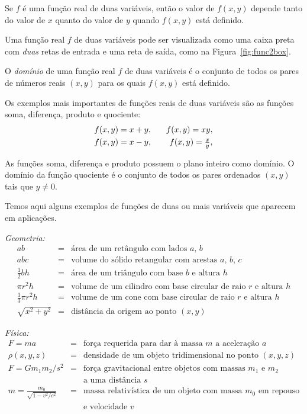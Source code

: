 \documentclass{svmono}
\begin{document}
Se $f$ é uma função real de duas variáveis, então o valor
de $f(x,y)$ depende tanto do valor de $x$ quanto do valor
de $y$ quando $f(x,y)$ está definido.

Uma função real $f$ de duas variáveis pode ser visualizada
como uma caixa preta com \emph{duas} retas de entrada e uma
reta de saída, como na Figura~\ref{fig:func2box}.


O \emph{domínio} de uma função real $f$ de duas variáveis é
o conjunto de todos os pares de números reais $(x,y)$ para os
quais $f(x,y)$ está definido.

Os exemplos mais importantes de funções reais de duas variáveis
são as funções soma, diferença, produto e quociente:
\begin{eqnarray*}
  f(x,y) = x+y, & \hspace{2ex} & f(x,y) = xy, \\
  f(x,y) = x-y, & \hspace{2ex} & \textstyle f(x,y) = \frac{x}{y},
\end{eqnarray*}

As funções soma, diferença e produto possuem o plano inteiro
como domínio. O domínio da função quociente é o conjunto de
todos os pares ordenados $(x,y)$ tais que $y \ne 0$.

Temos aqui alguns exemplos de funções de duas ou mais variáveis
que aparecem em aplicações.

\emph{Geometria:}
\begin{eqnarray*}
  ab & = & \text{área de um retângulo com lados $a$, $b$} \\
 abc & = & \text{volume do sólido retangular com arestas $a$, $b$, $c$} \\
\textstyle
\frac{1}{2}bh & = & \text{área de um triângulo com base $b$ e altura $h$} \\
\pi r^2 h & = & \text{volume de um cilindro com base circular de raio $r$ e altura $h$} \\
\textstyle
\frac{1}{3} \pi r^2 h & = & \text{volume de um cone com base circular
                            de raio $r$ e altura $h$} \\
\textstyle
\sqrt{x^2 + y^2} & = & \text{distância da origem ao ponto } (x,y)
\end{eqnarray*}

\emph{Física:}
\begin{eqnarray*}
 F = ma & = & \text{força requerida para dar à massa $m$ a aceleração $a$} \\
\rho(x,y,z) & = & \text{densidade de um objeto tridimensional no ponto $(x,y,z)$} \\
 F = G m_1 m_2 / s^2 & = &
    \text{força gravitacional entre objetos com massas $m_1$ e $m_2$} \\
                     &   &
    \text{a uma distância $s$}\\
 m = \frac{m_0}{\sqrt{1-v^2/c^2}} & = &
    \text{massa relativística de um objeto com massa $m_0$ em repouso} \\[-8pt]
                                  &   &
    \text{e velocidade $v$}
\end{eqnarray*}
\end{document}
